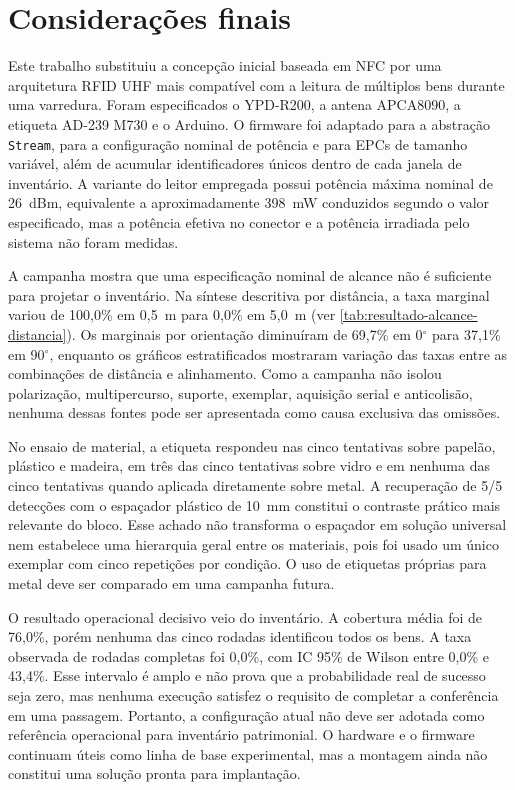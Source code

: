 %
%

\chapter{Considerações finais}
\label{cap:conclusao}

Este trabalho substituiu a concepção inicial baseada em NFC por uma arquitetura RFID UHF mais compatível com a leitura de múltiplos bens durante uma varredura. Foram especificados o YPD-R200, a antena APCA8090, a etiqueta AD-239 M730 e o Arduino. O firmware foi adaptado para a abstração \texttt{Stream}, para a configuração nominal de potência e para EPCs de tamanho variável, além de acumular identificadores únicos dentro de cada janela de inventário. A variante do leitor empregada possui potência máxima nominal de 26~dBm, equivalente a aproximadamente 398~mW conduzidos segundo o valor especificado, mas a potência efetiva no conector e a potência irradiada pelo sistema não foram medidas.

A campanha mostra que uma especificação nominal de alcance não é suficiente para projetar o inventário. Na síntese descritiva por distância, a taxa marginal variou de 100,0\% em 0,5~m para 0,0\% em 5,0~m (ver \autoref{tab:resultado-alcance-distancia}). Os marginais por orientação diminuíram de 69,7\% em 0$^\circ$ para 37,1\% em 90$^\circ$, enquanto os gráficos estratificados mostraram variação das taxas entre as combinações de distância e alinhamento. Como a campanha não isolou polarização, multipercurso, suporte, exemplar, aquisição serial e anticolisão, nenhuma dessas fontes pode ser apresentada como causa exclusiva das omissões.

No ensaio de material, a etiqueta respondeu nas cinco tentativas sobre papelão, plástico e madeira, em três das cinco tentativas sobre vidro e em nenhuma das cinco tentativas quando aplicada diretamente sobre metal. A recuperação de 5/5 detecções com o espaçador plástico de 10~mm constitui o contraste prático mais relevante do bloco. Esse achado não transforma o espaçador em solução universal nem estabelece uma hierarquia geral entre os materiais, pois foi usado um único exemplar com cinco repetições por condição. O uso de etiquetas próprias para metal deve ser comparado em uma campanha futura.

O resultado operacional decisivo veio do inventário. A cobertura média foi de 76,0\%, porém nenhuma das cinco rodadas identificou todos os bens. A taxa observada de rodadas completas foi 0,0\%, com IC 95\% de Wilson entre 0,0\% e 43,4\%. Esse intervalo é amplo e não prova que a probabilidade real de sucesso seja zero, mas nenhuma execução satisfez o requisito de completar a conferência em uma passagem. Portanto, a configuração atual não deve ser adotada como referência operacional para inventário patrimonial. O hardware e o firmware continuam úteis como linha de base experimental, mas a montagem ainda não constitui uma solução pronta para implantação.

